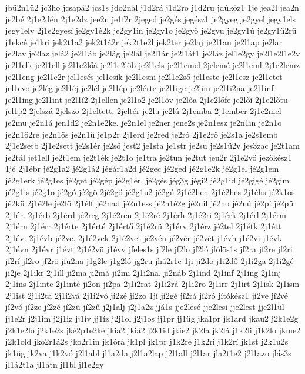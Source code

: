 {jbű2n1ü2
jc3ho
jcsapá2
jcs1s
jdo2nal
j1d2rá
j1d2ro
j1d2ru
jdúköz1
1je
jea2l
jea2n
je2bé
2j1e2dén
2j1e2dz
jee2n
je1f2r
2jeged
je2gés
jegész1
je2gyeg
je2gyel
jegy1els
jegy1elv
2j1e2gyesí
je2gy1é2k
je2gy1in
je2gy1o
je2győ
je2gyu
je2gy1ú
je2gy1ű2rű
j1ekcé
je1kri
jek2t1a2
jek2t1á2r
jek2t1e2l
jek2ter
je2laj
je2l1an
je2l1ap
je2lar
je2lav
je2laz
jelá2
je2l1áb
je2lág
je2lál
je2l1ár
je2l1át1
je2láz
jel1e2gy
je2l1e2l1e2v
je2l1elk
je2l1ell
je2l1e2lőá
je2l1e2lőb
je2l1els
je2l1emel
2jelemé
je2l1eml
2j1e2lemz
je2l1eng
je2l1e2r
jel1esés
jel1esik
je2l1esni
je2l1e2ső
jel1este
je2l1esz
je2l1etet
jel1evo
je2lég
je2l1éj
je2lél
je2l1ép
je2lérte
je2l1ige
je2lim
je2l1i2na
je2l1inf
je2l1ing
je2l1int
je2l1í2
2j1ellen
je2l1o2
je2l1öv
je2lőa
2j1e2lőfe
je2lőí
2j1e2lőtu
jel1p2
2jelszá
2jelszo
2j1eltett.
2jeltér
je2lu
je2lú
2j1emba
2j1ember
2j1e2mel
je2mu
je2n1á
jen1d2
je2n1e2ke.
je2n1el
je2ner
jene2s
je2n1esz
je2n1in
je2n1o
je2n1ő2re
je2n1ős
je2n1ü
je1p2r
2j1erd
je2red
je2ró
2j1e2rő
je2s1a
je2s1emb
2j1e2setb
2j1e2sett
je2s1ér
je2ső
jest2
je1sta
je1str
je2su
je2s1ü2v
jes3zac
je2t1am
je2tál
jet1ell
je2t1em
je2t1ék
je2t1o
je1tra
je2tun
je2tut
jeu2r
2j1e2vő
jezőkész1
1jé
2j1ébr
jé2g1a2
jé2g1á2
jégár1a2d
jé2gec
jé2ged
jé2g1e2k
jé2g1el
jé2g1em
jé2g1erk
jé2g1es
jé2get
jé2gép
jé2g1ér.
jé2gés
jég3g
jégi2
jé2g1id
jé2gigé
jé2gim
jé2g1is
jé2g1o
jé2gó
jé2gö
2jé2gő
jé2g1u2
jé2gú
2j1é2hen
2j1é2hes
2j1éhs
jé2k1os
jé2kü
2j1é2le
jé2lő
2j1élt
jé2nad
jé2n1ess
jé2n1é2g
jé2nil
jé2no
jé2nú
jé2pí
jé2pü
2j1ér.
2j1érb
2j1érd
jé2reg
2j1é2ren
2j1é2ré
2j1érh
2j1é2ri
2j1érk
2j1érl
2j1érm
2j1érn
2j1érr
2j1érte
2j1érté
2j1értő
2j1é2rü
2j1érv
2j1érz
jé2tel
2j1étk
2j1étt
2j1év.
2j1évb
jé2ve.
2j1é2vek
2j1é2vet
jé2vén
jé2vér
jé2vét
j1évh
j1é2vi
j1évk
2j1évn
2j1évr
j1évt
2j1é2vü
j1évv
jfeles1s
jf2le
jf2lo
jf2ló
jfölös1s
jf2ra
jf2re
jf2ri
jf2rí
jf2ro
jf2rö
jfu2na
j1g2le
j1g2ló
jg2ru
jhá2r1e
1ji
ji2do
j1i2dő
2j1i2ga
2j1i2gé
ji2je
2j1ikr
2j1ill
ji2ma
ji2má
ji2mi
2j1i2na.
ji2náb
2j1ind
2j1inf
2j1ing
2j1inj
2j1ins
2j1inte
2j1inté
ji2on
ji2pa
2j1i2rat
2j1i2rá
2j1i2ro
2j1irr
2j1irt
2j1isk
2j1ism
2j1ist
2j1i2ta
2j1i2vá
2j1i2vó
ji2zé
ji2zo
1jí
jí2gé
jí2rá
jí2ró
jítókész1
jí2ve
jí2vé
jí2vó
jí2ze
jí2zé
jí2zü
jí2zű
j2j1alj
j2j1a2z
jjá1s
jje2lesé
jje2lesi
jje2lest
jje2l1ül
jj1e2r
j2j1im
j2j1iz
jj1ív
jj1íz
j2j1ol
j2j1os
jj1pr
jj1üg
jka1pr
jk1ard
jkau2
j2k1e2g
j2k1e2lő
j2k1e2s
jké2p1e2ké
jkia2
jkiá2
j2k1id
jkie2
jk2la
jk2lá
j1k2li
j1k2lo
jkme2
j2k1old
jko2r1á2s
jko2r1in
jk1órá
jk1pl
jk1pr
j1k2ré
j1k2ri
j1k2rí
jk1st
j2k1u2s
jk1üg
jk2va
j1k2vó
j2l1abl
jl1a2da
j2l1a2lap
j2l1all
j2l1ar
jla2t1e2
j2l1azo
jlás3s
jl1á2t1a
jl1átn
jl1bl
jl1e2gy
}
